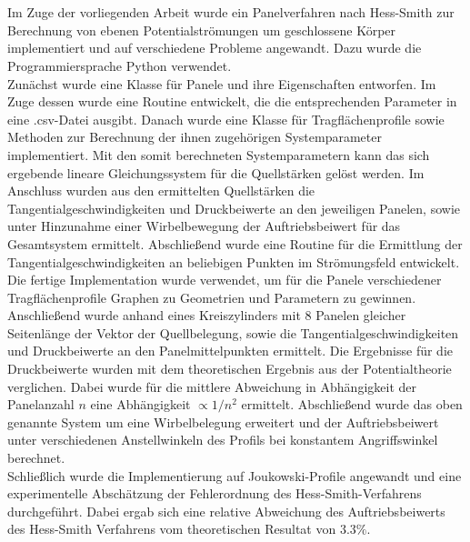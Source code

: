 \chapter*{\abstractname} %
Im Zuge der vorliegenden Arbeit wurde ein Panelverfahren nach Hess-Smith zur Berechnung von ebenen Potentialströmungen um geschlossene Körper implementiert und auf verschiedene Probleme angewandt. Dazu wurde die Programmiersprache Python verwendet.
\\
Zunächst wurde eine Klasse für Panele und ihre Eigenschaften entworfen. Im Zuge dessen wurde eine Routine entwickelt, die die entsprechenden Parameter in eine .csv-Datei ausgibt. Danach wurde eine Klasse für Tragflächenprofile sowie Methoden zur Berechnung der ihnen zugehörigen Systemparameter implementiert. Mit den somit berechneten Systemparametern kann das sich ergebende lineare Gleichungssystem für die Quellstärken gelöst werden. Im Anschluss wurden aus den ermittelten Quellstärken die Tangentialgeschwindigkeiten und Druckbeiwerte an den jeweiligen Panelen, sowie unter Hinzunahme einer Wirbelbewegung der Auftriebsbeiwert für das Gesamtsystem ermittelt. Abschließend wurde eine Routine für die Ermittlung der Tangentialgeschwindigkeiten an beliebigen Punkten im Strömungsfeld entwickelt.
\\
Die fertige Implementation wurde verwendet, um für die Panele verschiedener Tragflächenprofile Graphen zu Geometrien und Parametern zu gewinnen. Anschließend wurde anhand eines Kreiszylinders mit 8 Panelen gleicher Seitenlänge der Vektor der Quellbelegung, sowie die Tangentialgeschwindigkeiten und Druckbeiwerte an den Panelmittelpunkten ermittelt. Die Ergebnisse für die Druckbeiwerte wurden mit dem theoretischen Ergebnis aus der Potentialtheorie verglichen. Dabei wurde für die mittlere Abweichung in Abhängigkeit der Panelanzahl $n$ eine Abhängigkeit $\propto 1 / n^2$ ermittelt. Abschließend wurde das oben genannte System um eine Wirbelbelegung erweitert und der Auftriebsbeiwert unter verschiedenen Anstellwinkeln des Profils bei konstantem Angriffswinkel berechnet. 
\\
Schließlich wurde die Implementierung auf Joukowski-Profile angewandt und eine experimentelle Abschätzung der Fehlerordnung des Hess-Smith-Verfahrens durchgeführt. Dabei ergab sich eine relative Abweichung des Auftriebsbeiwerts des Hess-Smith Verfahrens vom theoretischen Resultat von $3.3 \%$.

\newpage
